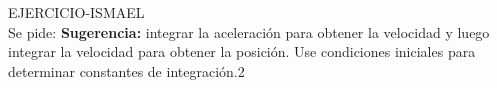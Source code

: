 

  
 \begin{multicols}{2}
    \begin{excercise}[][][]{}{
        EJERCICIO-ISMAEL\\
        Se pide:
        \textbf{Sugerencia:} integrar la aceleración para obtener la velocidad y luego integrar la velocidad para obtener la posición. Use condiciones iniciales para determinar constantes de integración.2
        }
    \end{excercise}
 \end{multicols}
